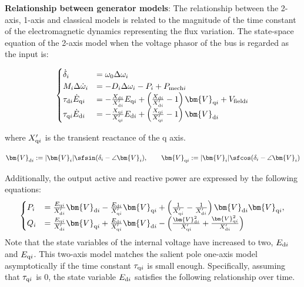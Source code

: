 \documentclass[graybox, envcountchap]{svmult}
\begin{document}
\begin{COLUMN}
\noindent \textbf{Relationship between generator models}:
The relationship between the 2-axis, 1-axis and classical models is related to
the magnitude of the time constant of the electromagnetic dynamics representing
the flux variation. The state-space equation of the 2-axis model when the
voltage phasor of the bus is regarded as the input is:

\begin{equation*}
  \begin{aligned}%
    \begin{cases}
      \dot{\delta}_i&= \omega_0  \Delta \omega_i\\
      M_i   \Delta \dot{\omega}_i&= 
      - D_i \Delta\omega_i  
      - P_i 
      +P_{{\rm mech}i} 
      \\
      \tau_{{\rm d}i} \dot{E}_{{\rm q}i} & = 
      - \tfrac{ X_{{\rm d}i} }{ X_{{\rm d}i}' }E_{{\rm q}i}
      +\left(
      \tfrac{ X_{{\rm d}i} }{ X_{{\rm d}i}' } -1
      \right)
      \bm{V}_{{\rm q}i}
      + V_{{\rm field}i} \\
      \tau_{{\rm q}i} \dot{E}_{{\rm d}i} & = 
      - \tfrac{ X_{{\rm q}i} }{ X_{{\rm q}i}' }E_{{\rm d}i}
      +\left(
      \tfrac{ X_{{\rm q}i} }{ X_{{\rm q}i}' } -1
      \right)
      \bm{V}_{{\rm d}i}
    \end{cases}
  \end{aligned}
\end{equation*}

where $X_{{\rm q}i}'$ is the transient reactance of the q axis.

\[
  \bm{V}_{{\rm d}i}:=
  |\bm{V}_i| \sfsin (\delta_i - \angle \bm{V}_i ) 
  ,\qquad
  \bm{V}_{{\rm q}i}:=
  |\bm{V}_i| \sfcos (\delta_i - \angle \bm{V}_i ) 
\]

Additionally, the output active and reactive power are expressed by the
following equations:
\begin{equation*}
  \begin{aligned}%
    \begin{cases}
      P_i & =  \frac{E_{{\rm q}i}}{X_{{\rm d}i}' } \bm{V}_{{\rm d}i}
      - \frac{E_{{\rm d}i}}{X_{{\rm q}i}' } \bm{V}_{{\rm q}i}
      +
      \left(
      \frac{1}{X_{{\rm q}i}'} - \frac{1}{X_{{\rm d}i}'} 
      \right)
      \bm{V}_{{\rm d}i} \bm{V}_{{\rm q}i}
      , \\
      Q_i & =  
      \frac{E_{{\rm q}i}}{X_{{\rm d}i}' } \bm{V}_{{\rm q}i}
      + \frac{E_{{\rm d}i}}{X_{{\rm q}i}' } \bm{V}_{{\rm d}i}
      -
      \left(
      \frac{\bm{V}_{{\rm d}i}^2}{X_{{\rm q}i}'} 
      +
      \frac{\bm{V}_{{\rm q}i}^2 }{X_{{\rm d}i}'} 
      \right)
    \end{cases}
  \end{aligned}
\end{equation*}
Note that the state variables of the internal voltage have increased to two,
$E_{{\rm d}i}$ and $E_{{\rm q}i}$. This two-axis model matches the salient pole
one-axis model asymptotically if the time constant $\tau_{{\rm q}i}$ is small
enough. Specifically, assuming that $\tau_{{\rm q}i}$ is 0, the state variable
$E_{{\rm d}i}$ satisfies the following relationship over time.


\end{COLUMN}
\end{document}
